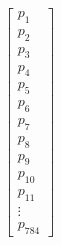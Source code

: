 \documentclass[preview]{standalone}
\begin{document}
\begin{align*}
\begin{bmatrix} p_{1} \\ p_{2} \\ p_{3} \\ p_{4} \\ p_{5} \\ p_{6} \\ p_{7} \\ p_{8} \\ p_{9} \\ p_{10} \\ p_{11} \\ \vdots \\ p_{784} \end{bmatrix}
\end{align*}
\end{document}
